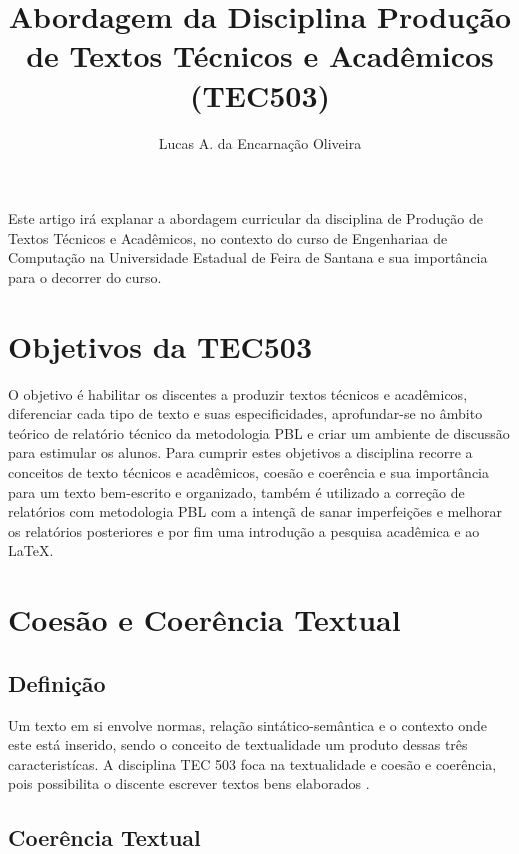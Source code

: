 \documentclass[12pt]{article}
\title{Abordagem da Disciplina Produção de Textos Técnicos e Acadêmicos\\ (TEC503)}
\author{Lucas A. da Encarnação Oliveira\inst{1} }
\begin{document}
 

\maketitle

     
\begin{resumo} 
  Este artigo irá explanar a abordagem curricular da disciplina de Produção de Textos Técnicos e Acadêmicos, no contexto do curso de Engenhariaa de Computação na Universidade Estadual de Feira de Santana e sua importância para o decorrer do curso.
\end{resumo}


\section{Objetivos da TEC503}

O objetivo é habilitar os discentes a produzir textos técnicos e acadêmicos, diferenciar cada tipo de texto e suas especificidades, aprofundar-se no âmbito teórico de relatório técnico da metodologia PBL e criar um ambiente de discussão para estimular os alunos.
Para cumprir estes objetivos a disciplina recorre a conceitos de texto técnicos e acadêmicos, coesão e coerência e sua importância para um texto bem-escrito e organizado, também é utilizado a correção de relatórios com metodologia PBL com a intençã de sanar imperfeições e melhorar os relatórios posteriores e por fim uma introdução a pesquisa acadêmica e ao \LaTeX.


\section{Coesão e Coerência Textual} \label{sec:firstpage}
 
\subsection{Definição}

Um texto em si envolve normas, relação sintático-semântica e o contexto onde este está inserido, sendo o conceito de textualidade um produto dessas três caracteristícas. A disciplina TEC 503 foca na textualidade e coesão e coerência, pois possibilita
o discente escrever textos bens elaborados \cite{koch:02}.


\subsection{Coerência Textual}
\end{document}
